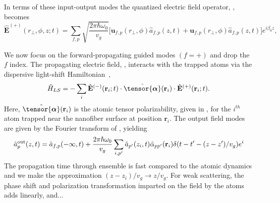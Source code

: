 \documentclass[preprint,aps,pra,onecolumn]{revtex4-1} %
\newcommand{\poltens}{\hat{\tensor{\boldsymbol{\alpha}}}}
\newcommand{\change}[1]{{\color{RoyalBlue} #1}}
\begin{document}
	
In terms of these input-output modes the quantized electric field operator, , becomes
	\begin{equation} \label{Eq::PropagatingElectricField}
		\hat{\mathbf{E}}^{(+)}(r\!_\perp,\phi,z;t) = \sum_{f,p} \sqrt{ \frac{2 \pi \hbar \omega_0}{ v_g} } \big[ \mathbf{u}_{f,p}(r\!_\perp,\phi) \hat{a}_{f,p}(z,t) + \mathbf{u}_{f,p}(r\!_\perp,\phi) \hat{a}_{f,p}(z,t) \big] e^{i \beta_0 z},
	\end{equation}
	
We now focus on the forward-propagating guided modes $(f=+)$ and drop the $f$ index.  	The propagating electric field, , interacts with the trapped atoms via the dispersive light-shift Hamiltonian~\cite{deutsch_quantum_2010,kien_dynamical_2013},
	\begin{equation} \label{Eq::LightShiftHam}
		\hat{H}_{LS} = - \sum_i \hat{\mathbf{E}}^{(-)}(\mathbf{r}_i ; t ) \cdot \poltens(\mbf{r}_i) \cdot \hat{\mathbf{E}}^{(+)}(\mathbf{r}_i;t ).
	\end{equation}
Here, $\poltens(\br_i)$ is the atomic tensor polarizability, given in , for the $i^{th}$ atom trapped near the nanofiber surface at position $\mathbf{r}_i$. The output field modes are given by the Fourier transform of , yielding \cite{le_kien_correlations_2008} \change{
	\begin{align} \label{Eq::ScatteringSolution}
		\hat{a}^{\rm out}_{p}(z,t) = \hat{a}_{f,p}(-\infty,t) + \frac{2\pi \hbar \omega_0}{v_g} \sum_{i,p'} \hat{a}_{p'}(z_i,t) \hat{\alpha}_{pp'}(\mathbf{r}_i) \delta(t-t'- (z-z')/v_g)e^{i}
	\end{align} 
The propagation time through ensemble is fast compared to the atomic dynamics and we make the approximation $(z-z_i)/v_g \rightarrow z/v_g$.  For weak scattering, the phase shift and polarization transformation imparted on the field by the atoms adds linearly, and...}
\end{document}
